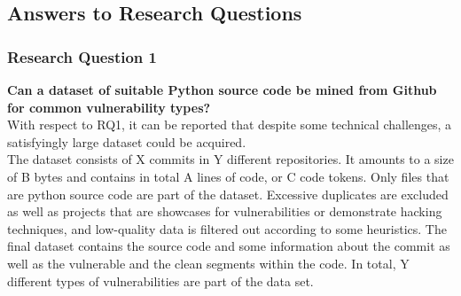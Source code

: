 \documentclass[
	a4paper,
	pagesize,
	pdftex,
	12pt,
	twoside, %
	BCOR=5mm, %
	ngerman,
	fleqn,
	final,
	]{scrartcl}
\begin{document}
\subsection{Answers to Research Questions}

\subsubsection{Research Question 1}
\textbf{Can a dataset of suitable Python source code be mined from Github for common vulnerability types?}\\
With respect to RQ1, it can be reported that despite some technical challenges, a satisfyingly large dataset could be acquired.\\
The dataset consists of X commits in Y different repositories. It amounts to a size of B bytes and contains in total A lines of code, or C code tokens. Only files that are python source code are part of the dataset. Excessive duplicates are excluded as well as projects that are showcases for vulnerabilities or demonstrate hacking techniques, and low-quality data is filtered out according to some heuristics. The final dataset contains the source code and some information about the commit as well as the vulnerable and the clean segments within the code. In total, Y different types of vulnerabilities are part of the data set.
\end{document}
